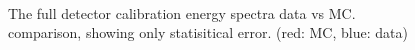 \begin{figure}[h!]
 \\

\caption{The full detector calibration energy spectra data vs MC. comparison, showing only statisitical error. (red: MC, blue: data)}
\label{fig:goodfit2}
\end{figure}

